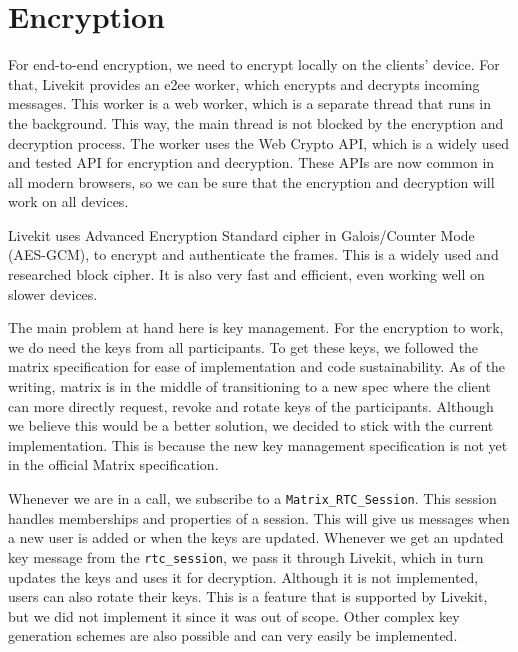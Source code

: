 \documentclass{report}
\begin{document}
\section{Encryption}
For end-to-end encryption, we need to encrypt locally on the clients' device. For that, Livekit provides an e2ee worker,
which encrypts and decrypts incoming messages. This worker is a web worker, which is a separate
thread that runs in the background. This way, the main thread is not blocked by the encryption and decryption
process. The worker uses the Web Crypto API, which is a widely used and tested API for encryption and decryption.
These APIs are now common in all modern browsers, so we can be sure that the encryption and decryption will work on
all devices.

Livekit uses Advanced Encryption Standard cipher in Galois/Counter Mode (AES-GCM)\cite{national_institute_of_standards_and_technology_us_advanced_2023}\cite{
mcgrew_galoiscounter_nodate}, to encrypt and authenticate the frames. This is a widely used and researched block
cipher. It is also very fast and efficient, even working well on slower devices.

The main problem at hand here is key management. For the encryption to work, we do need the keys from all
participants. To get these keys, we followed the matrix specification for ease of implementation and code
sustainability. As of the writing, matrix is in the middle of transitioning to a new spec where the client can more
directly request, revoke and rotate keys of the participants. Although we believe this would be a better solution, we
decided to stick with the current implementation. This is because the new key management specification is not yet in
the official Matrix specification.

Whenever we are in a call, we subscribe to a \lstinline[language=js]{Matrix_RTC_Session}. This session handles
memberships and properties of a session. This will give us messages when a new user is added or when the keys are
updated. Whenever we get an updated key message from the \lstinline[language=js]{rtc_session}, we pass it through
Livekit, which in turn updates the keys and uses it for decryption. Although it is not implemented, users can also rotate
their keys. This is a feature that is supported by Livekit, but we did not implement it since it was out of scope.
Other complex key generation schemes are also possible and can very easily be implemented.
\end{document}
